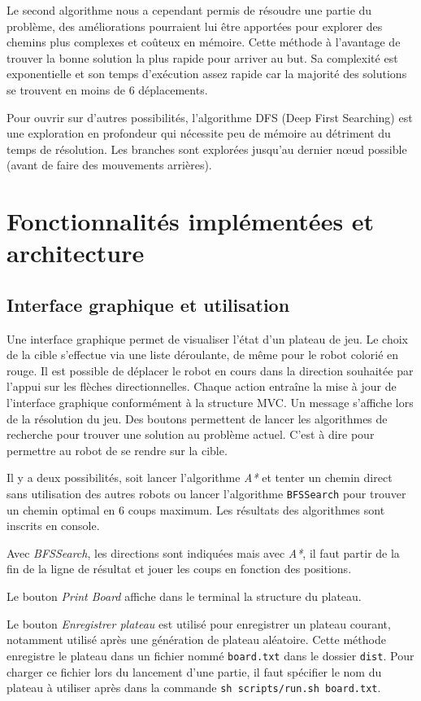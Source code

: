 \documentclass[a4paper]{article} %
\begin{document}
Le second algorithme nous a cependant permis de résoudre une partie du problème, des améliorations pourraient lui être apportées pour explorer des chemins plus complexes et coûteux en mémoire. Cette méthode à l'avantage de trouver la bonne solution la plus rapide pour arriver au but. Sa complexité est exponentielle et son temps d'exécution assez rapide car la majorité des solutions se trouvent en moins de 6 déplacements.

Pour ouvrir sur d'autres possibilités, l'algorithme DFS (Deep First Searching) est une exploration en profondeur qui nécessite peu de mémoire au détriment du temps de résolution. Les branches sont explorées jusqu'au dernier nœud possible (avant de faire des mouvements arrières).

\section{Fonctionnalités implémentées et architecture}
	\subsection{Interface graphique et utilisation}
	Une interface graphique\up{\ref{interface}} permet de visualiser l'état d'un plateau de jeu. Le choix de la cible s'effectue via une liste déroulante, de même pour le robot colorié en rouge. Il est possible de déplacer le robot en cours dans la direction souhaitée par l'appui sur les flèches directionnelles.
	Chaque action entraîne la mise à jour de l'interface graphique conformément à la structure MVC. Un message s'affiche lors de la résolution du jeu.
	Des boutons permettent de lancer les algorithmes de recherche pour trouver une solution au problème actuel. C'est à dire pour permettre au robot de se rendre sur la cible.
	
Il y a deux possibilités, soit lancer l'algorithme \textsl{A*} et tenter un chemin direct sans utilisation des autres robots ou lancer l'algorithme \texttt{BFSSearch} pour trouver un chemin optimal en 6 coups maximum. Les résultats des algorithmes sont inscrits en console.
	
Avec \textsl{BFSSearch}, les directions sont indiquées mais avec \textsl{A*}, il faut partir de la fin de la ligne de résultat et jouer les coups en fonction des positions.

Le bouton \textsl{Print Board} affiche dans le terminal la structure du plateau.

Le bouton \textsl{Enregistrer plateau} est utilisé pour enregistrer un plateau courant, notamment utilisé après une génération de plateau aléatoire. Cette méthode enregistre le plateau dans un fichier nommé \texttt{board.txt} dans le dossier \texttt{dist}. Pour charger ce fichier lors du lancement d'une partie, il faut spécifier le nom du plateau à utiliser après dans la commande \texttt{sh scripts/run.sh board.txt}.
	
\end{document}
